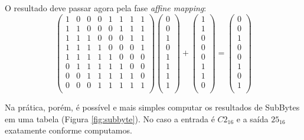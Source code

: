 \begin{example}
O resultado deve passar agora pela fase {\em affine mapping}:
\begin{displaymath}
\left(\begin{array}{cccccccc}
1 & 0 & 0 & 0 & 1 & 1 & 1 & 1 \\
1 & 1 & 0 & 0 & 0 & 1 & 1 & 1 \\
1 & 1 & 1 & 0 & 0 & 0 & 1 & 1 \\
1 & 1 & 1 & 1 & 0 & 0 & 0 & 1 \\
1 & 1 & 1 & 1 & 1 & 0 & 0 & 0 \\
0 & 1 & 1 & 1 & 1 & 1 & 0 & 0 \\
0 & 0 & 1 & 1 & 1 & 1 & 1 & 0 \\
0 & 0 & 0 & 1 & 1 & 1 & 1 & 1 \\\end{array} \right) 
\left( \begin{array}{c}
0\\ 0\\ 1\\ 0\\ 1\\ 1\\ 1\\ 1\\\end{array} \right)
+
\left( \begin{array}{c}
1\\ 1\\ 0\\ 0\\ 0\\ 1\\ 1\\ 0\\\end{array} \right)
=
\left( \begin{array}{c}
0\\ 0\\ 1\\ 0\\ 0\\ 1\\ 0\\ 1\\\end{array} \right)
\end{displaymath}

Na prática, porém, é possível e mais simples computar os resultados de SubBytes em uma tabela (Figura \ref{fig:subbyte}).
No caso a entrada é $C2_{16}$ e a saída $25_{16}$ exatamente conforme computamos.
\end{example}


